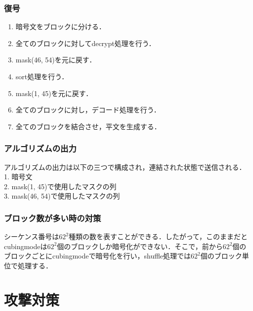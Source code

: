 \documentclass[titlepage]{jarticle}
\begin{document}
\subsubsection{復号}
\begin{enumerate}
\item 暗号文をブロックに分ける．
\item 全てのブロックに対してdecrypt処理を行う．
\item mask(46, 54)を元に戻す．
\item sort処理を行う．
\item mask(1, 45)を元に戻す．
\item 全てのブロックに対し，デコード処理を行う．
\item 全てのブロックを結合させ，平文を生成する．
\end{enumerate}

\subsubsection{アルゴリズムの出力}
アルゴリズムの出力は以下の三つで構成され，連結された状態で送信される．\\
1. 暗号文\\
2. mask(1, 45)で使用したマスクの列\\
3. mask(46, 54)で使用したマスクの列\\

\subsubsection{ブロック数が多い時の対策}
シーケンス番号は\(62^2\)種類の数を表すことができる．したがって，このままだとcubingmodeは\(62^2\)個のブロックしか暗号化ができない．そこで，前から\(62^2\)個のブロックごとにcubingmodeで暗号化を行い，shuffle処理では\(62^2\)個のブロック単位で処理する．

\section{攻撃対策}
\end{document}
